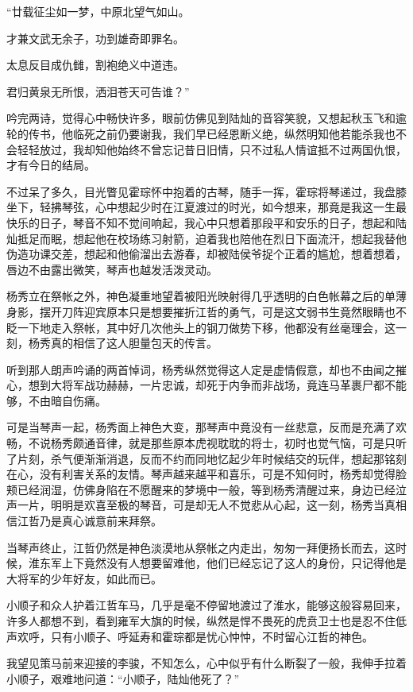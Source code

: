 “廿载征尘如一梦，中原北望气如山。

才兼文武无余子，功到雄奇即罪名。

太息反目成仇雠，割袍绝义中道违。

君归黄泉无所恨，洒泪苍天可告谁？”

吟完两诗，觉得心中畅快许多，眼前仿佛见到陆灿的音容笑貌，又想起秋玉飞和逾轮的传书，他临死之前仍要谢我，我们早已经恩断义绝，纵然明知他若能杀我也不会轻轻放过，我却知他始终不曾忘记昔日旧情，只不过私人情谊抵不过两国仇恨，才有今日的结局。

不过呆了多久，目光瞥见霍琮怀中抱着的古琴，随手一挥，霍琮将琴递过，我盘膝坐下，轻拂琴弦，心中想起少时在江夏渡过的时光，如今想来，那竟是我这一生最快乐的日子，琴音不知不觉间响起，我心中只想着那段平和安乐的日子，想起和陆灿抵足而眠，想起他在校场练习射箭，迫着我也陪他在烈日下面流汗，想起我替他伪造功课交差，想起和他偷溜出去游春，却被陆侯爷捉个正着的尴尬，想着想着，唇边不由露出微笑，琴声也越发活泼灵动。

杨秀立在祭帐之外，神色凝重地望着被阳光映射得几乎透明的白色帐幕之后的单薄身影，摆开刀阵迎宾原本只是想要摧折江哲的勇气，可是这文弱书生竟然眼睛也不眨一下地走入祭帐，其中好几次他头上的钢刀做势下移，他都没有丝毫理会，这一刻，杨秀真的相信了这人胆量包天的传言。

听到那人朗声吟诵的两首悼词，杨秀纵然觉得这人定是虚情假意，却也不由闻之摧心，想到大将军战功赫赫，一片忠诚，却死于内争而非战场，竟连马革裹尸都不能够，不由暗自伤痛。

可是当琴声一起，杨秀面上神色大变，那琴声中竟没有一丝悲意，反而是充满了欢畅，不说杨秀颇通音律，就是那些原本虎视耽耽的将士，初时也觉气恼，可是只听了片刻，杀气便渐渐消退，反而不约而同地忆起少年时候结交的玩伴，想起那铭刻在心，没有利害关系的友情。琴声越来越平和喜乐，可是不知何时，杨秀却觉得脸颊已经润湿，仿佛身陷在不愿醒来的梦境中一般，等到杨秀清醒过来，身边已经泣声一片，明明是欢喜至极的琴音，可是却无人不觉悲从心起，这一刻，杨秀当真相信江哲乃是真心诚意前来拜祭。

当琴声终止，江哲仍然是神色淡漠地从祭帐之内走出，匆匆一拜便扬长而去，这时候，淮东军上下竟然没有人想要留难他，他们已经忘记了这人的身份，只记得他是大将军的少年好友，如此而已。

小顺子和众人护着江哲车马，几乎是毫不停留地渡过了淮水，能够这般容易回来，许多人都想不到，看到雍军大旗的时候，纵然是悍不畏死的虎贲卫士也是忍不住低声欢呼，只有小顺子、呼延寿和霍琮都是忧心忡忡，不时留心江哲的神色。

我望见策马前来迎接的李骏，不知怎么，心中似乎有什么断裂了一般，我伸手拉着小顺子，艰难地问道：“小顺子，陆灿他死了？”

